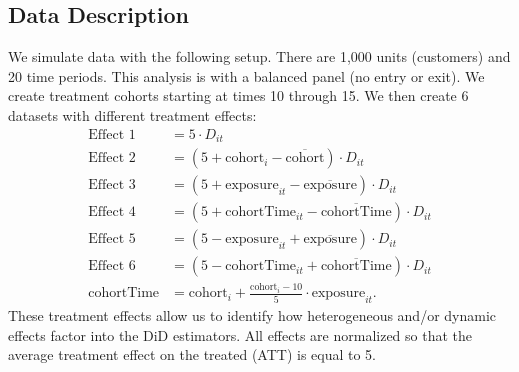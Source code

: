 \documentclass[12pt]{article}
\begin{document}
\subsection{Data Description}
We simulate data with the following setup. There are 1,000 units (customers) and 20 time periods. This analysis is with a balanced panel (no entry or exit). We create treatment cohorts starting at times 10 through 15. We then create 6 datasets with different treatment effects:
\begin{align*}
    \text{Effect 1} &= 5\cdot D_{it} \\
    \text{Effect 2} &= (5 + \text{cohort}_i - \overline{\text{cohort}})\cdot D_{it} \\
    \text{Effect 3} &= (5 + \text{exposure}_{it} - \overline{\text{exposure}})\cdot D_{it} \\
    \text{Effect 4} &= (5 + \text{cohortTime}_{it} - \overline{\text{cohortTime}})\cdot D_{it} \\
    \text{Effect 5} &= (5 - \text{exposure}_{it} + \overline{\text{exposure}})\cdot D_{it} \\
    \text{Effect 6} &= (5 - \text{cohortTime}_{it} + \overline{\text{cohortTime}})\cdot D_{it} \\
    \text{cohortTime} &= \text{cohort}_i + \frac{\text{cohort}_i-10}{5}\cdot \text{exposure}_{it}.
\end{align*}
These treatment effects allow us to identify how heterogeneous and/or dynamic effects factor into the DiD estimators. All effects are normalized so that the average treatment effect on the treated (ATT) is equal to 5.
\end{document}
